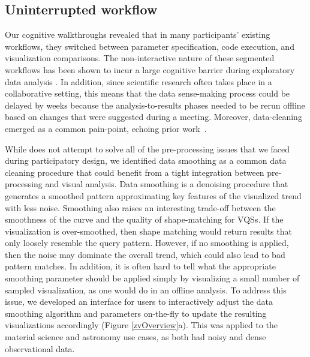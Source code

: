 \subsection{Uninterrupted workflow}
\par Our cognitive walkthroughs revealed that in many participants' existing workflows, they switched between parameter specification, code execution, and visualization comparisons. The non-interactive nature of these segmented workflows has been shown to incur a large cognitive barrier during exploratory data analysis \cite{Kery2017}. In addition, since scientific research often takes place in a collaborative setting, this means that the data sense-making process could be delayed by weeks because the analysis-to-results phases needed to be rerun offline based on changes that were suggested during a meeting. Moreover, data-cleaning emerged as a common pain-point, echoing prior work~\cite{kandel2011wrangler,Kandel2012}.


 While \zv does not attempt to solve all of the pre-processing issues that we faced during participatory design, we identified data smoothing as a common data cleaning procedure that could benefit from a tight integration between pre-processing and visual analysis. Data smoothing is a denoising procedure that generates a smoothed pattern approximating key features of the visualized trend with less noise. Smoothing also raises an interesting trade-off between the smoothness of the curve and the quality of shape-matching for VQSs. If the visualization is over-smoothed, then shape matching would return results that only loosely resemble the query pattern. However, if no smoothing is applied, then the noise may dominate the overall trend, which could also lead to bad pattern matches. In addition, it is often hard to tell what the appropriate smoothing parameter should be applied simply by visualizing a small number of sampled visualization, as one would do in an offline analysis.
\npar To address this issue, we developed an interface for users to interactively adjust the data smoothing algorithm and parameters on-the-fly to update the resulting visualizations accordingly (Figure \ref{zvOverview}a). This was applied to the material science and astronomy use cases, as both had noisy and dense observational data.

